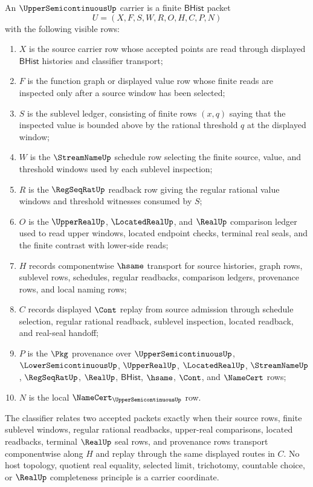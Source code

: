 \begin{definition}
\label{def:uppersemicontinuous-carrier}
An $\UpperSemicontinuousUp$ carrier is a finite $\mathsf{BHist}$ packet
$$
U=(X,F,S,W,R,O,H,C,P,N)
$$
with the following visible rows:
\begin{enumerate}
\item $X$ is the source carrier row whose accepted points are read through
  displayed $\mathsf{BHist}$ histories and classifier transport;
\item $F$ is the function graph or displayed value row whose finite reads are
  inspected only after a source window has been selected;
\item $S$ is the sublevel ledger, consisting of finite rows $(x,q)$ saying
  that the inspected value is bounded above by the rational threshold $q$ at
  the displayed window;
\item $W$ is the $\StreamNameUp$ schedule row selecting the finite source,
  value, and threshold windows used by each sublevel inspection;
\item $R$ is the $\RegSeqRatUp$ readback row giving the regular rational
  value windows and threshold witnesses consumed by $S$;
\item $O$ is the $\UpperRealUp$, $\LocatedRealUp$, and $\RealUp$ comparison
  ledger used to read upper windows, located endpoint checks, terminal real
  seals, and the finite contrast with lower-side reads;
\item $H$ records componentwise $\hsame$ transport for source histories,
  graph rows, sublevel rows, schedules, regular readbacks, comparison
  ledgers, provenance rows, and local naming rows;
\item $C$ records displayed $\Cont$ replay from source admission through
  schedule selection, regular rational readback, sublevel inspection, located
  readback, and real-seal handoff;
\item $P$ is the $\Pkg$ provenance over $\UpperSemicontinuousUp$,
  $\LowerSemicontinuousUp$, $\UpperRealUp$, $\LocatedRealUp$,
  $\StreamNameUp$, $\RegSeqRatUp$, $\RealUp$, $\mathsf{BHist}$, $\hsame$,
  $\Cont$, and $\NameCert$ rows;
\item $N$ is the local $\NameCert_{\UpperSemicontinuousUp}$ row.
\end{enumerate}
The classifier relates two accepted packets exactly when their source rows,
finite sublevel windows, regular rational readbacks, upper-real comparisons,
located readbacks, terminal $\RealUp$ seal rows, and provenance rows transport
componentwise along $H$ and replay through the same displayed routes in $C$.
No host topology, quotient real equality, selected limit, trichotomy,
countable choice, or $\RealUp$ completeness principle is a carrier
coordinate.
\end{definition}

